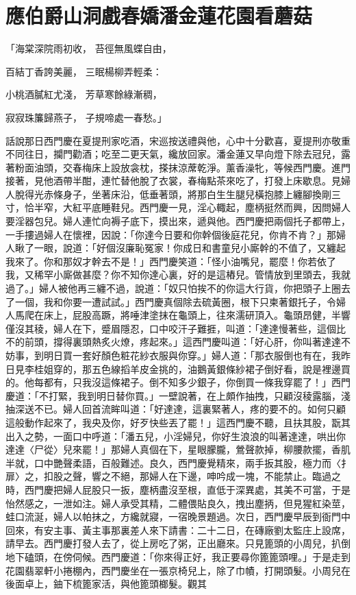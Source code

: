 %

\chapter{應伯爵山洞戲春嬌\KG 潘金蓮花園看蘑菇}


「海棠深院雨初收，  苔徑無風蝶自由，

百結丁香誇美麗，  三眠楊柳弄輕柔：

小桃酒膩紅尤淺，  芳草寒餘綠漸稠，

寂寂珠簾歸燕子，  子規啼處一春愁。」

話說那日西門慶在夏提刑家吃酒，宋巡按送禮與他，心中十分歡喜，夏提刑亦敬重不同往日，攔門勸酒；吃至二更天氣，纔放回家。潘金蓮又早向燈下除去冠兒，露著粉面油頭，交春梅床上設放衾枕，搽抹涼蓆乾淨。薰香澡牝，等候西門慶。進門接著，見他酒帶半酣，連忙替他脫了衣裳，春梅點茶來吃了，打發上床歇息。見婦人脫得光赤條身子，坐著床沿，低垂著頭，將那白生生腿兒橫抱膝上纏腳換剛三寸，恰半窄，大紅平底睡鞋兒。西門慶一見，淫心輙起，塵柄挺然而興，因問婦人要淫器包兒。婦人連忙向褥子底下，摸出來，遞與他。西門慶把兩個托子都帶上，一手摟過婦人在懷裡，因說：「你達今日要和你幹個後庭花兒，你肯不肯？」那婦人瞅了一眼，說道：「好個沒廉恥冤家！你成日和書童兒小廝幹的不值了，又纏起我來了。你和那奴才幹去不是！」西門慶笑道：「怪小油嘴兒，罷麼！你若依了我，又稀罕小廝做甚麼？你不知你達心裏，好的是這樁兒。管情放到里頭去，我就過了。」婦人被他再三纏不過，說道：「奴只怕挨不的你這大行貨，你把頭子上圈去了一個，我和你要一遭試試。」西門慶真個除去硫黃圈，根下只柬著銀托子，令婦人馬爬在床上，屁股高蹶，將唾津塗抹在龜頭上，往來濡研頂入。龜頭昂健，半響僅沒其稜，婦人在下，蹙眉隱忍，口中咬汗子難捱，叫道：「達達慢著些，這個比不的前頭，撐得裏頭熱炙火燎，疼起來。」這西門慶叫道：「好心肝，你叫著達達不妨事，到明日買一套好顏色粧花紗衣服與你穿。」婦人道：「那衣服倒也有在，我昨日見李桂姐穿的，那五色線搯羊皮金挑的，油鵝黃銀條紗裙子倒好看，說是裡邊買的。他每都有，只我沒這條裙子。倒不知多少銀子，你倒買一條我穿罷了！」西門慶道：「不打緊，我到明日替你買。」一壁說著，在上頗作抽拽，只顧沒稜露腦，淺抽深送不已。婦人回首流眸叫道：「好達達，這裏緊著人，疼的要不的。如何只顧這般動作起來了，我央及你，好歹快些丟了罷！」這西門慶不聽，且扶其股，翫其出入之勢，一面口中呼道：「潘五兒，小淫婦兒，你好生浪浪的叫著達達，哄出你達達〈尸從〉兒來罷！」那婦人真個在下，星眼朦朧，鶯聲款掉，柳腰款擺，香肌半就，口中艷聲柔語，百般難述。良久，西門慶覺精來，兩手扳其股，極力而〈扌扉〉之，扣股之聲，響之不絕，那婦人在下邊，呻吟成一塊，不能禁止。臨過之時，西門慶把婦人屁股只一扳，塵柄盡沒至根，直低于深異處，其美不可當，于是怡然感之，一泄如注。婦人承受其精，二體偎貼良久，拽出塵抦，但見猩紅染莖，蛙口流涎，婦人以帕抹之，方纔就寢，一宿晚景題過。次日，西門慶早辰到衙門中回來，有安主事、黃主事那裏差人來下請書：二十二日，在磚廠劉太監庄上設席，請早去。西門慶打發人去了，從上房吃了粥，正出廳來。只見篦頭的小周兒，扒倒地下磕頭，在傍伺候。西門慶道：「你來得正好，我正要尋你篦篦頭哩。」于是走到花園翡翠軒小捲棚內，西門慶坐在一張京椅兒上，除了巾幘，打開頭髮。小周兒在後面卓上，鈾下梳篦家活，與他篦頭榔髮。觀其